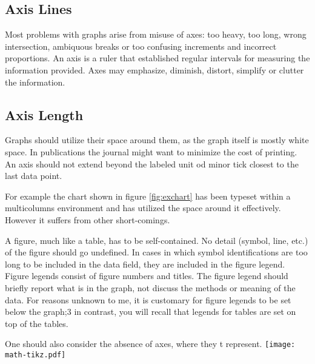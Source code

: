 \subsection{Axis Lines}

Most problems with graphs arise from misuse of axes: too heavy, too long, wrong intersection,
ambiquous breaks or too confusing increments and incorrect proportions. An axis is a ruler that established
regular intervals for measuring the information provided. Axes may emphasize, diminish, distort, simplify
or clutter the information.

\clearpage

\begin{multicols}{2}
\subsection{Axis Length}

Graphs should utilize their space around them, as the graph itself is mostly white space. In publications the journal might want to minimize the cost of printing. An axis should not extend beyond the labeled unit od minor tick closest to the last data point.

\captionsetup[figure]{format=hang, name=Fig, font=footnotesize}
\label{fig:exchart}
\medskip


For example the chart shown in figure \ref{fig:exchart} has been typeset within a multicolumns environment and has utilized the space around it effectively. However it suffers from other short-comings. 

A figure, much like a table, has to be self-contained. No detail (symbol, line, etc.) of the figure should go undefined. In cases in which symbol
identifications are too long to be included in the data field, they are
included in the figure legend. Figure legends consist of figure numbers
and titles. The figure legend should briefly report what is in the graph,
not discuss the methods or meaning of the data. For reasons unknown
to me, it is customary for figure legends to be set below the graph;3
in contrast, you will recall that legends for tables are set on top of the
tables. \cite{ivan2001}

One should also consider the absence of axes, where they t represent.
\texttt{[image: math-tikz.pdf]}
\end{multicols}


